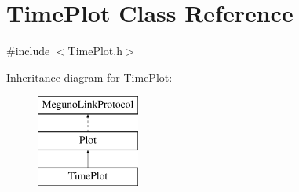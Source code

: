 \hypertarget{class_time_plot}{\section{Time\-Plot Class Reference}
\label{class_time_plot}
}


{\ttfamily \#include $<$Time\-Plot.\-h$>$}

Inheritance diagram for Time\-Plot\-:\begin{figure}[H]
\begin{center}
\leavevmode
\includegraphics[height=3.000000cm]{class_time_plot}
\end{center}
\end{figure}
